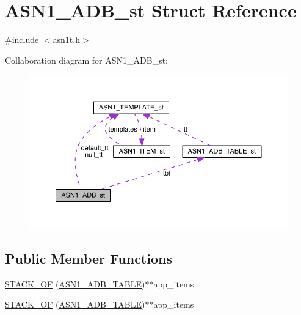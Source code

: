 \hypertarget{struct_a_s_n1___a_d_b__st}{}\section{A\+S\+N1\+\_\+\+A\+D\+B\+\_\+st Struct Reference}
\label{struct_a_s_n1___a_d_b__st}


{\ttfamily \#include $<$asn1t.\+h$>$}



Collaboration diagram for A\+S\+N1\+\_\+\+A\+D\+B\+\_\+st\+:\nopagebreak
\begin{figure}[H]
\begin{center}
\leavevmode
\includegraphics[width=350pt]{struct_a_s_n1___a_d_b__st__coll__graph}
\end{center}
\end{figure}
\subsection*{Public Member Functions}
\begin{DoxyCompactItemize}
\item 
\hyperlink{struct_a_s_n1___a_d_b__st_ad4b333ac294123b284998159cf5b1164}{S\+T\+A\+C\+K\+\_\+\+OF} (\hyperlink{crypto_2asn1_2asn1t_8h_a5fb2bc0218a977f3b0de4df83e654f94}{A\+S\+N1\+\_\+\+A\+D\+B\+\_\+\+T\+A\+B\+LE})$\ast$$\ast$app\+\_\+items
\item 
\hyperlink{struct_a_s_n1___a_d_b__st_ad4b333ac294123b284998159cf5b1164}{S\+T\+A\+C\+K\+\_\+\+OF} (\hyperlink{crypto_2asn1_2asn1t_8h_a5fb2bc0218a977f3b0de4df83e654f94}{A\+S\+N1\+\_\+\+A\+D\+B\+\_\+\+T\+A\+B\+LE})$\ast$$\ast$app\+\_\+items
\end{DoxyCompactItemize}
